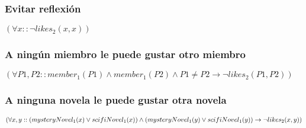\documentclass[a4paper,11pt]{article}
\begin{document}
\begin{center}
\begin{minipage}{0.23\textwidth}
    \end{minipage}
\end{center}

\begin{center}
\end{center}

\subsubsection{Evitar reflexión}
$(\forall x :: \neg likes_2(x, x))$

\subsubsection{A ningún miembro le puede gustar otro miembro}
$(\forall P1, P2 :: member_1(P1) \land member_1(P2) \land P1 \not= P2 \rightarrow \neg likes_2(P1, P2))$

\subsubsection{A ninguna novela le puede gustar otra novela}
$(\forall x, y :: (mysteryNovel_1(x) \lor scifiNovel_1(x)) \land (mysteryNovel_1(y) \lor scifiNovel_1(y)) \\ \rightarrow \neg likes_2(x, y))$
\end{document}
